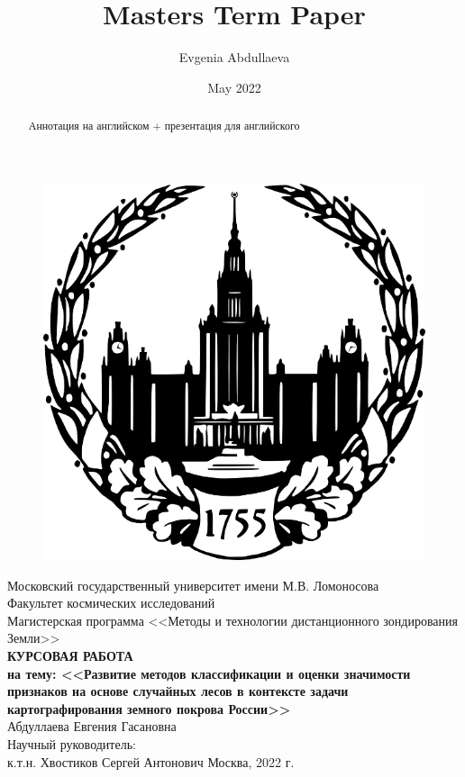 \documentclass[14pt, a4paper, oneside]{extarticle}
\title{Masters Term Paper}
\author{Evgenia Abdullaeva}
\date{May 2022}
\begin{document}
\begin{titlepage}
    \centering
        \begin{figure}[H]
            \centering
            \includegraphics[scale=1.6]{msu-logo}
        \end{figure}
        Московский государственный университет имени М.В. Ломоносова\\
        \vspace{0.5cm}
        Факультет космических исследований\\
        Магистерская программа <<Методы и технологии дистанционного зондирования Земли>>\\
        \vfill
        \textbf{КУРСОВАЯ РАБОТА\\
        на тему: <<Развитие методов классификации и оценки значимости признаков на основе случайных лесов в контексте задачи картографирования земного покрова России>>}\\
        \vfill
        Абдуллаева Евгения Гасановна\\
        \vspace{0.5cm}
        Научный руководитель:\\
        к.т.н. Хвостиков Сергей Антонович
        \vfill
        Москва, 2022 г.
\end{titlepage}

\begin{abstract}
Аннотация на английском + презентация для английского
\end{abstract}
\begin{abstract}

\end{abstract}
\setcounter{page}{2}
\newpage
\end{document}
